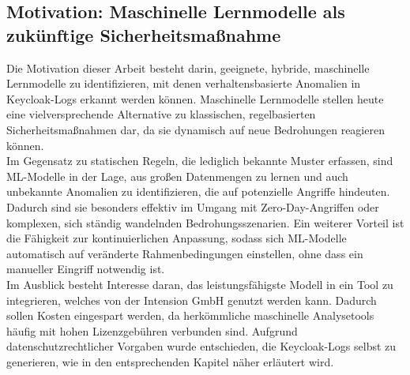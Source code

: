 \documentclass[a4paper,12pt]{article}
\begin{document}
	\subsection{Motivation: Maschinelle Lernmodelle als zukünftige Sicherheitsmaßnahme}
	Die Motivation dieser Arbeit besteht darin, geeignete, hybride, maschinelle Lernmodelle zu identifizieren, mit denen verhaltensbasierte Anomalien in Keycloak-Logs erkannt werden können. Maschinelle Lernmodelle stellen heute eine vielversprechende Alternative zu klassischen, regelbasierten Sicherheitsmaßnahmen dar, da sie dynamisch auf neue Bedrohungen reagieren können.
	\\[0.5em]
	Im Gegensatz zu statischen Regeln, die lediglich bekannte Muster erfassen, sind ML-Modelle in der Lage, aus großen Datenmengen zu lernen und auch unbekannte Anomalien zu identifizieren, die auf potenzielle Angriffe hindeuten. Dadurch sind sie besonders effektiv im Umgang mit Zero-Day-Angriffen oder komplexen, sich ständig wandelnden Bedrohungsszenarien. Ein weiterer Vorteil ist die Fähigkeit zur kontinuierlichen Anpassung, sodass sich ML-Modelle automatisch auf veränderte Rahmenbedingungen einstellen, ohne dass ein manueller Eingriff notwendig ist.
	\\[0.5em]
	Im Ausblick besteht Interesse daran, das leistungsfähigste Modell in ein Tool zu integrieren, welches von der Intension GmbH genutzt werden kann. Dadurch sollen Kosten eingespart werden, da herkömmliche maschinelle Analysetools häufig mit hohen Lizenzgebühren verbunden sind. Aufgrund datenschutzrechtlicher Vorgaben wurde entschieden, die Keycloak-Logs selbst zu generieren, wie in den entsprechenden Kapitel näher erläutert wird.
	
\end{document}
